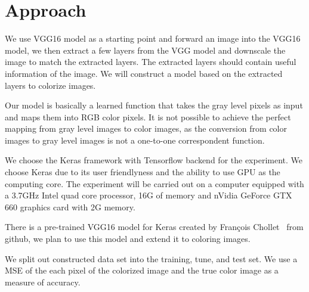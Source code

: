 \documentclass[12pt]{article}
\begin{document}
\section{Approach}
We use VGG16 model as a starting point and forward an image into the VGG16 model, we then extract a few layers from the VGG model and downscale the image to match the extracted layers. The extracted layers should contain useful information of the image. We will construct a model based on the extracted layers to colorize images.  


Our model is basically a learned function that takes the gray level pixels as input and maps them into RGB color pixels. It is not possible to achieve the perfect mapping from gray level images to color images, as the conversion from color images to gray level images is not a one-to-one correspondent function. 


We choose the Keras framework with Tensorflow backend for the experiment. We choose Keras due to its user friendlyness and the ability to use GPU as the computing core. The experiment will be carried out on a computer equipped with a 3.7GHz Intel quad core processor, 16G of memory and nVidia GeForce GTX 660 graphics card with 2G memory.  


There is a pre-trained VGG16 model for Keras created by François Chollet~\cite{pretrainedmodel} from github, we plan to use this model and extend it to coloring images. 


We split out constructed data set into the training, tune, and test set. We use a MSE of the each pixel of the colorized image and the true color image as a measure of accuracy. 







\end{document}
